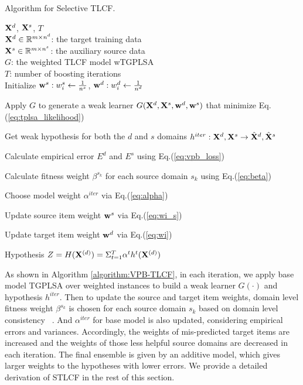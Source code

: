 \begin{algorithm}[tb]
\caption{Algorithm for Selective TLCF.}
\begin{algorithmic}

 $\mathbf{X}^{d}$, $\mathbf{X}^{s}$, $T$\\
$\mathbf{X}^{d} \in \mathbb{R}^{m\times n^d}$: the target training data \\
$\mathbf{X}^{s} \in \mathbb{R}^{m\times n^s}$: the auxiliary source data\\
$G$: the weighted TLCF model wTGPLSA\\
$T$: number of boosting iterations \\

 Initialize $\mathbf{w}^s : w_i^s\leftarrow\frac{1}{n^s}$, $\mathbf{w}^d : w_i^d\leftarrow\frac{1}{n^d}$


 Apply $G$ to generate a weak learner $G(\mathbf{X}^{d}, \mathbf{X}^{s}, \mathbf{w}^{d}, \mathbf{w}^{s})$ that minimize Eq.(\ref{eq:tplsa_likelihood}) %

 Get weak hypothesis for both the $d$ and $s$ domains $h^{iter} : \mathbf{X}^{d}, \mathbf{X}^{s}\rightarrow \hat {\mathbf{X}}^{d}, \hat {\mathbf{X}}^{s}$

 Calculate empirical error $E^{d}$ and $E^{s}$ using Eq.(\ref{eq:vpb_loss})

 Calculate fitness weight $\beta^{s_k}$ for each source domain $s_k$ using Eq.(\ref{eq:beta})

 Choose model weight $\alpha^{iter}$ via Eq.(\ref{eq:alpha})

 Update source item weight $\mathbf{w}^{s}$ via Eq.(\ref{eq:wi_s})

 Update target item weight $\mathbf{w}^{d}$  via Eq.(\ref{eq:wi})

\ENDFOR

 Hypothesis $Z = H(\mathbf{X}^{(d)}) = \Sigma_{t=1}^T \alpha^t h^t(\mathbf{X}^{(d)})$

\end{algorithmic}
\label{algorithm:VPB-TLCF}
\end{algorithm}

As shown in Algorithm \ref{algorithm:VPB-TLCF}, in each iteration, we apply base model TGPLSA over weighted instances to build a weak learner $G(\cdot)$ and hypothesis $h^{iter}$. Then to update the source and target item weights, domain level fitness weight $\beta^{s_k}$ is chosen for each source domain $s_k$ based on domain level consistency ~\cite{/ecml/Eaton2008Modeling}. And $\alpha^{iter}$ for base model is also updated, considering empirical errors and variances. Accordingly, the weights of mis-predicted target items are increased and the weights of those less helpful source domains are decreased in each iteration. The final ensemble is given by an additive model, which gives larger weights to the hypotheses with lower errors.
We provide a detailed derivation of STLCF in the rest of this section.

